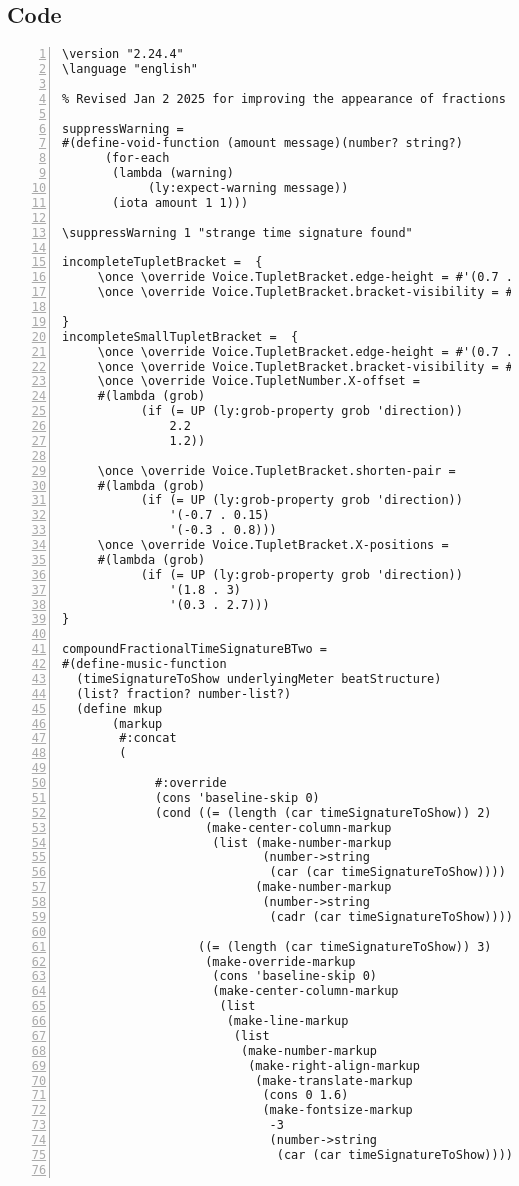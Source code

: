 \subsection{Code}
\begin{Verbatim}[numbers=left,xleftmargin=5mm]
\version "2.24.4"
\language "english"

% Revised Jan 2 2025 for improving the appearance of fractions

suppressWarning =
#(define-void-function (amount message)(number? string?)
      (for-each
       (lambda (warning)
            (ly:expect-warning message))
       (iota amount 1 1)))

\suppressWarning 1 "strange time signature found"

incompleteTupletBracket =  {
     \once \override Voice.TupletBracket.edge-height = #'(0.7 . 0)
     \once \override Voice.TupletBracket.bracket-visibility = ##t

}
incompleteSmallTupletBracket =  {
     \once \override Voice.TupletBracket.edge-height = #'(0.7 . 0)
     \once \override Voice.TupletBracket.bracket-visibility = ##t
     \once \override Voice.TupletNumber.X-offset =
     #(lambda (grob)
           (if (= UP (ly:grob-property grob 'direction))
               2.2
               1.2))

     \once \override Voice.TupletBracket.shorten-pair =
     #(lambda (grob)
           (if (= UP (ly:grob-property grob 'direction))
               '(-0.7 . 0.15)
               '(-0.3 . 0.8)))
     \once \override Voice.TupletBracket.X-positions =
     #(lambda (grob)
           (if (= UP (ly:grob-property grob 'direction))
               '(1.8 . 3)
               '(0.3 . 2.7)))
}

compoundFractionalTimeSignatureBTwo =
#(define-music-function
  (timeSignatureToShow underlyingMeter beatStructure)
  (list? fraction? number-list?)
  (define mkup
       (markup
        #:concat
        (

             #:override
             (cons 'baseline-skip 0)
             (cond ((= (length (car timeSignatureToShow)) 2)
                    (make-center-column-markup
                     (list (make-number-markup
                            (number->string
                             (car (car timeSignatureToShow))))
                           (make-number-markup
                            (number->string
                             (cadr (car timeSignatureToShow)))))))

                   ((= (length (car timeSignatureToShow)) 3)
                    (make-override-markup
                     (cons 'baseline-skip 0)
                     (make-center-column-markup
                      (list
                       (make-line-markup
                        (list
                         (make-number-markup
                          (make-right-align-markup
                           (make-translate-markup
                            (cons 0 1.6)
                            (make-fontsize-markup
                             -3
                             (number->string
                              (car (car timeSignatureToShow)))))))


\end{Verbatim}

